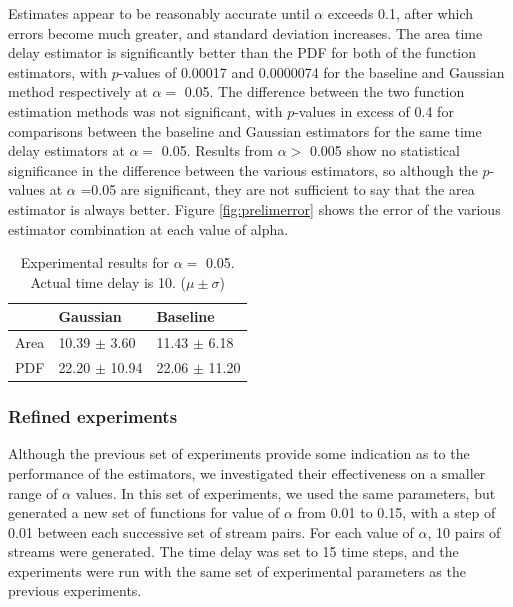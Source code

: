 \documentclass[a4paper,11pt]{article}
\begin{document}
Estimates appear to be reasonably accurate until $\alpha$ exceeds 0.1, after
which errors become much greater, and standard deviation increases. The area
time delay estimator is significantly better than the PDF for both of the
function estimators, with $p$-values of 0.00017 and 0.0000074 for the baseline
and Gaussian method respectively at $\alpha=$ 0.05. The difference between the
two function estimation methods was not significant, with $p$-values in excess
of 0.4 for comparisons between the baseline and Gaussian estimators for the same
time delay estimators at $\alpha=$ 0.05. Results from $\alpha>$ 0.005 show no
statistical significance in the difference between the various estimators, so
although the $p$-values at $\alpha$ =0.05 are significant, they are not
sufficient to say that the area estimator is always better. Figure
\ref{fig:prelimerror} shows the error of the various estimator combination at
each value of alpha.
\begin{table}[htb]

\begin{center}
\begin{tabular}{l|ll}
       &  Gaussian           &  Baseline           \\
\hline
 Area  &  10.39 $\pm$ 3.60   &  11.43 $\pm$ 6.18   \\
 PDF   &  22.20 $\pm$ 10.94  &  22.06 $\pm$ 11.20  \\
\end{tabular}
\end{center}
\caption{Experimental results for $\alpha=$ 0.05. Actual time delay is 10. ($\mu\pm\sigma$)} \label{fig:pretab}\end{table}
\subsubsection{Refined experiments}
\label{sec-8-1-2}

Although the previous set of experiments provide some indication as to the
performance of the estimators, we investigated their effectiveness on a smaller
range of $\alpha$ values. In this set of experiments, we used the same
parameters, but generated a new set of functions for value of $\alpha$ from
0.01 to 0.15, with a step of 0.01 between each successive set of stream
pairs. For each value of $\alpha$, 10 pairs of streams were generated. The time
delay was set to 15 time steps, and the experiments were run with the same set
of experimental parameters as the previous experiments.
\end{document}
